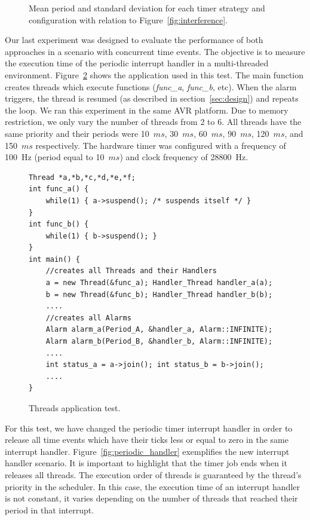 \documentclass[final,3pd,times]{elsarticle}
\newcommand{\fig}[4][tbp]{
  \begin{figure}[#1]
    {\centering{\texttt{[image: \#2]}}\par}
    \caption{#3}
    \label{fig:#2}
  \end{figure}
}
\newcommand{\ms}{$ms$}
\begin{document}
\fig[ht]{deviation}{Mean period and standard deviation for each timer
  strategy and configuration with relation to
  Figure~\ref{fig:interference}.}{scale=0.6}

Our last experiment was designed to evaluate the performance of both
approaches in a scenario with concurrent time events. The objective is
to measure the execution time of the periodic interrupt handler in a
multi-threaded environment.  Figure~\ref{prg:threads_app} shows the
application used in this test.  The main function creates threads which
execute functions (\textit{func\_a}, \textit{func\_b}, etc). When the
alarm triggers, the thread is resumed (as described in
section~\ref{sec:design}) and repeats the loop. We ran this experiment
in the same AVR platform. Due to memory restriction, we only vary the
number of threads from 2 to 6. All threads have the same priority and
their periods were 10~\ms{}, 30~\ms{}, 60~\ms{}, 90~\ms{}, 120~\ms{},
and 150~\ms{} respectively. The hardware timer was configured with a
frequency of 100~Hz (period equal to 10~\ms{}) and clock frequency of
28800~Hz.

\begin{figure}[ht]
   \lstset{frame=single,language=C++,xleftmargin=2em,style=prg,basicstyle=\scriptsize}
   \begin{lstlisting}
Thread *a,*b,*c,*d,*e,*f;
int func_a() {
    while(1) { a->suspend(); /* suspends itself */ }
}
int func_b() {
    while(1) { b->suspend(); }
}
int main() {
    //creates all Threads and their Handlers
    a = new Thread(&func_a); Handler_Thread handler_a(a);
    b = new Thread(&func_b); Handler_Thread handler_b(b);
    ....
    //creates all Alarms
    Alarm alarm_a(Period_A, &handler_a, Alarm::INFINITE);
    Alarm alarm_b(Period_B, &handler_b, Alarm::INFINITE);
    ....
    int status_a = a->join(); int status_b = b->join();
    ....
}
   \end{lstlisting}
  \caption{Threads application test.}
  \label{prg:threads_app}
\end{figure}

For this test, we have changed the periodic timer interrupt handler in
order to release all time events which have their ticks less or equal to
zero in the same interrupt handler. Figure~\ref{fig:periodic_handler}
exemplifies the new interrupt handler scenario. It is important to
highlight that the timer job ends when it releases all threads. The
execution order of threads is guaranteed by the thread's priority in the
scheduler. In this case, the execution time of an interrupt handler is
not constant, it varies depending on the number of threads that reached
their period in that interrupt.
\end{document}
